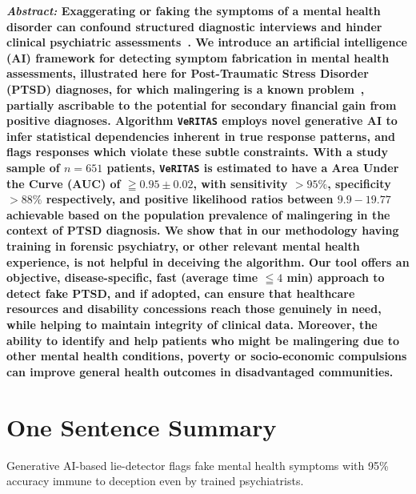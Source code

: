 \documentclass[onecolumn,10pt]{IEEEtran}
\def\vrts{\texttt{VeRITAS}\xspace}
\begin{document}
\maketitle

{\bf \sffamily \fontsize{10}{12}\selectfont \noindent   
  {\normalfont \itshape Abstract:} Exaggerating or faking  the symptoms of a mental health disorder  can confound structured diagnostic interviews and hinder clinical psychiatric assessments~\cite{Rogers1997,rogers2008clinical}.  We introduce an  artificial intelligence (AI) framework for detecting symptom fabrication in mental health assessments, illustrated here for Post-Traumatic Stress Disorder (PTSD) diagnoses, for which malingering is a known problem~\cite{frueh2007us,taylor2007detection}, partially ascribable to the  potential for secondary financial gain from positive diagnoses.  Algorithm \vrts employs novel generative AI to infer statistical dependencies inherent in true response patterns, and flags  responses which violate these subtle  constraints.  With a study sample of $n=651$ patients, \vrts is estimated to have a   Area Under the Curve (AUC) of $\geqq 0.95\pm 0.02$, with  sensitivity $>95\%$, specificity $>88\%$ respectively, and positive likelihood ratios between $9.9 - 19.77$ achievable based on the population prevalence of malingering in the context of PTSD diagnosis. We show that in our methodology having training in forensic psychiatry, or other relevant mental health experience, is not helpful in deceiving  the algorithm. Our tool   offers an  objective, disease-specific, fast (average time $\leqq 4$ min)  approach to detect fake  PTSD, and if adopted, can  ensure that healthcare resources and disability concessions reach  those genuinely in need,  while  helping to maintain  integrity of clinical data. Moreover, the ability to identify and help  patients who might be malingering due to other mental health conditions, poverty or   socio-economic compulsions can  improve general health outcomes  in disadvantaged communities.  
}

\vspace{10pt}


\section*{One Sentence Summary}
Generative AI-based lie-detector flags fake mental health symptoms with 95\% accuracy immune to deception even by trained psychiatrists.
\end{document}
